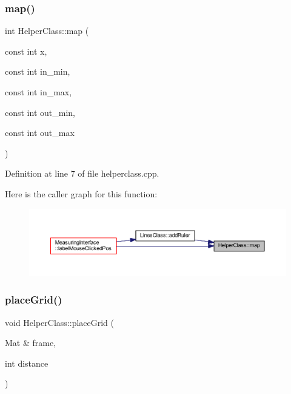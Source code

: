\subsubsection{\texorpdfstring{map()}{map()}}
{\footnotesize\ttfamily int Helper\+Class\+::map (\begin{DoxyParamCaption}\item[{const int}]{x,  }\item[{const int}]{in\+\_\+min,  }\item[{const int}]{in\+\_\+max,  }\item[{const int}]{out\+\_\+min,  }\item[{const int}]{out\+\_\+max }\end{DoxyParamCaption})\hspace{0.3cm}{\ttfamily [static]}}



Definition at line 7 of file helperclass.\+cpp.

Here is the caller graph for this function\+:
\nopagebreak
\begin{figure}[H]
\begin{center}
\leavevmode
\includegraphics[width=350pt]{classHelperClass_a527b26e649e561032d957ce26beb922e_icgraph}
\end{center}
\end{figure}
\mbox{\label{classHelperClass_a2628c0f86fb5959325f6aa4272b6f210}} 
\subsubsection{\texorpdfstring{placeGrid()}{placeGrid()}}
{\footnotesize\ttfamily void Helper\+Class\+::place\+Grid (\begin{DoxyParamCaption}\item[{Mat \&}]{frame,  }\item[{int}]{distance }\end{DoxyParamCaption})\hspace{0.3cm}{\ttfamily [static]}}




